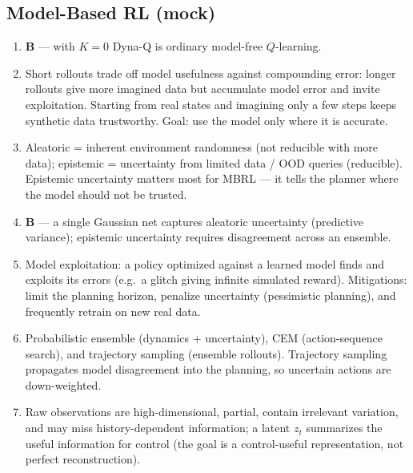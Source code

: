\documentclass[11pt,oneside]{article}
\begin{document}
\subsection*{Model-Based RL (mock)}
\begin{enumerate}[label=\textbf{Q\arabic*.}, leftmargin=3em, itemsep=3pt, start=48]
  \item \textbf{B} --- with $K=0$ Dyna-Q is ordinary model-free $Q$-learning.
  \item Short rollouts trade off model usefulness against compounding error: longer rollouts give more imagined data but accumulate model error and invite exploitation. Starting from real states and imagining only a few steps keeps synthetic data trustworthy. Goal: use the model only where it is accurate.
  \item Aleatoric = inherent environment randomness (not reducible with more data); epistemic = uncertainty from limited data / OOD queries (reducible). Epistemic uncertainty matters most for MBRL --- it tells the planner where the model should not be trusted.
  \item \textbf{B} --- a single Gaussian net captures aleatoric uncertainty (predictive variance); epistemic uncertainty requires disagreement across an ensemble.
  \item Model exploitation: a policy optimized against a learned model finds and exploits its errors (e.g.\ a glitch giving infinite simulated reward). Mitigations: limit the planning horizon, penalize uncertainty (pessimistic planning), and frequently retrain on new real data.
  \item Probabilistic ensemble (dynamics + uncertainty), CEM (action-sequence search), and trajectory sampling (ensemble rollouts). Trajectory sampling propagates model disagreement into the planning, so uncertain actions are down-weighted.
  \item Raw observations are high-dimensional, partial, contain irrelevant variation, and may miss history-dependent information; a latent $z_t$ summarizes the useful information for control (the goal is a control-useful representation, not perfect reconstruction).
\end{enumerate}
\end{document}
